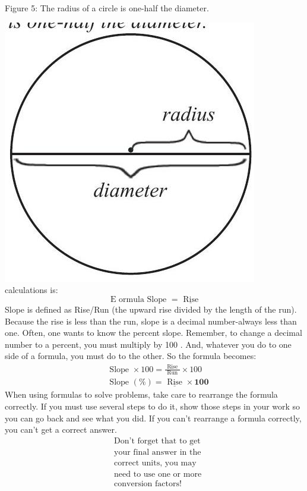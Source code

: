 \documentclass[10pt]{article}
\begin{document}
Figure 5: The radius of a circle is one-half the diameter.

\includegraphics[max width=\textwidth]{2022_09_16_4d34b76b97ee13a67df7g-10}\\
calculations is:
$$
\text { E ormula Slope }=\underline{\text { Rise }}
$$
Slope is defined as Rise/Run (the upward rise divided by the length of the run). Because the rise is less than the run, slope is a decimal number-always less than one. Often, one wants to know the percent slope. Remember, to change a decimal number to a percent, you must multiply by 100 . And, whatever you do to one side of a formula, you must do to the other. So the formula becomes:
$$
\begin{aligned}
&\text { Slope } \times 100=\frac{\text { Rise }}{\text { Run }} \times 100 \\
&\text { Slope }(\%)=\underline{\text { Rise }} \times \mathbf{1 0 0}
\end{aligned}
$$
When using formulas to solve problems, take care to rearrange the formula correctly. If you must use several steps to do it, show those steps in your work so you can go back and see what you did. If you can't rearrange a formula correctly, you can't get a correct answer.
$$
\begin{aligned}
&\text { Don't forget that to get } \\
&\text { your final answer in the } \\
&\text { correct units, you may } \\
&\text { need to use one or more } \\
&\text { conversion factors! }
\end{aligned}
$$
\end{document}
